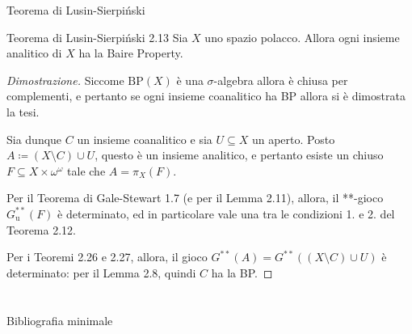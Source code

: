 \documentclass[babel]{beamer}
\renewcommand{\href}[2]{#2}
\begin{document}
\begin{frame}[label={sec:org4097097}]{Teorema di Lusin-Sierpiński}
\begin{alertblock}{Teorema di Lusin-Sierpiński 2.13}
Sia \(X\) uno \href{../../../../../../../org/roam/20250301194013-spazio_polacco.org}{spazio polacco}. Allora ogni \href{../../../../../../../org/roam/20250525220742-insieme_analitico.org}{insieme analitico} di \(X\) ha la \href{../../../../../../../org/roam/20250514154039-proprieta_di_baire.org}{Baire Property}.
\end{alertblock}
\begin{proof}[Dimostrazione]
Siccome \(\mathrm{BP}(X)\) è una \href{../../../../../../../org/roam/20250526100313-sigma_algebra.org}{\(\sigma\)-algebra} allora è chiusa per complementi, e pertanto se ogni insieme coanalitico ha BP allora si è dimostrata la tesi.

Sia dunque \(C\) un insieme coanalitico e sia \(U \subseteq X\) un aperto. Posto \(A\coloneqq (X\setminus C)\cup U\), questo è un insieme analitico, e pertanto  esiste un chiuso \(F \subseteq X\times\omega^{\omega}\) tale che \(A=\pi_{X}(F)\).

Per il \href{../../../../../../../org/roam/20250514144736-teorema_di_gale_stewart.org}{Teorema di Gale-Stewart} 1.7 (e per il Lemma 2.11), allora, il \href{../../../../../../../org/roam/20250513111844-gioco_di_banach_mazur.org}{**-gioco \(G^{ * *}_{\text{u}}(F)\)} è \href{../../../../../../../org/roam/20250513155732-logic_game.org}{determinato}, ed in particolare vale una tra le condizioni 1. e 2. del Teorema 2.12.

Per i \href{../../../../../../../org/roam/20250514174717-teorema_di_caratterizzazione_dei_comagri_tramite_il_gioco_di_banach_mazur.org}{Teoremi} 2.26 e 2.27, allora, il \href{../../../../../../../org/roam/20250513111844-gioco_di_banach_mazur.org}{gioco \(G^{**}(A) = G^{ * *}\left((X\setminus C) \cup U\right)\)} è determinato: per il Lemma 2.8, quindi \(C\) ha la BP.
\end{proof}
\end{frame}
\section{\null}
\label{sec:orgc3d4485}

\begin{frame}[label={sec:org2d74e23}]{Bibliografia minimale}
\nocite{*}
\printbibliography
\end{frame}
\end{document}
